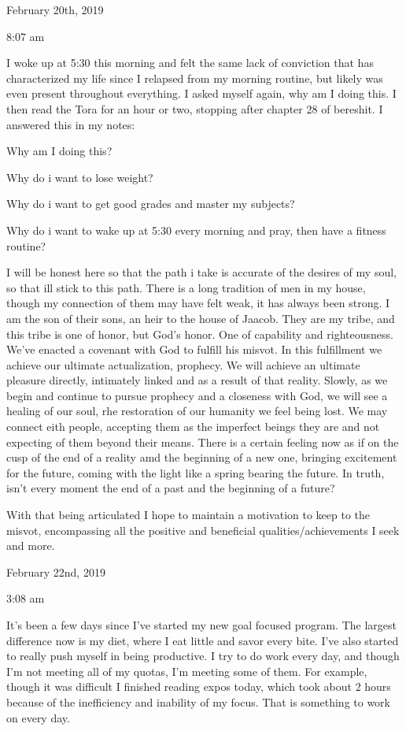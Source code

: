 \bigskip
\bigskip
February 20th, 2019

8:07 am

I woke up at 5:30 this morning and felt the same lack of conviction that
has characterized my life since I relapsed from my morning routine, but
likely was even present throughout everything. I asked myself again, why
am I doing this. I then read the Tora for an hour or two, stopping after
chapter 28 of bereshit. I answered this in my notes:

Why am I doing this?

Why do i want to lose weight?

Why do i want to get good grades and master my subjects?

Why do i want to wake up at 5:30 every morning and pray, then have a
fitness routine?

I will be honest here so that the path i take is accurate of the desires
of my soul, so that ill stick to this path. There is a long tradition of
men in my house, though my connection of them may have felt weak, it has
always been strong. I am the son of their sons, an heir to the house of
Jaacob. They are my tribe, and this tribe is one of honor, but God's
honor. One of capability and righteousness. We've enacted a covenant
with God to fulfill his misvot. In this fulfillment we achieve our
ultimate actualization, prophecy. We will achieve an ultimate pleasure
directly, intimately linked and as a result of that reality. Slowly, as
we begin and continue to pursue prophecy and a closeness with God, we
will see a healing of our soul, rhe restoration of our humanity we feel
being lost. We may connect eith people, accepting them as the imperfect
beings they are and not expecting of them beyond their means. There is a
certain feeling now as if on the cusp of the end of a reality amd the
beginning of a new one, bringing excitement for the future, coming with
the light like a spring bearing the future. In truth, isn't every moment
the end of a past and the beginning of a future?

With that being articulated I hope to maintain a motivation to keep to
the misvot, encompassing all the positive and beneficial
qualities/achievements I seek and more.

\bigskip
\bigskip
February 22nd, 2019

3:08 am

It's been a few days since I've started my new goal focused program. The
largest difference now is my diet, where I eat little and savor every
bite. I've also started to really push myself in being productive. I try
to do work every day, and though I'm not meeting all of my quotas, I'm
meeting some of them. For example, though it was difficult I finished
reading expos today, which took about 2 hours because of the
inefficiency and inability of my focus. That is something to work on
every day.

